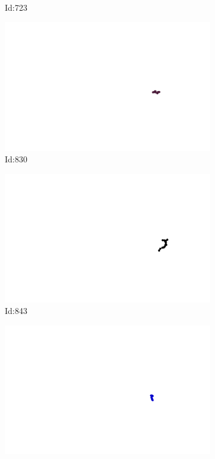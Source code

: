 \documentclass[12pt,twoside]{report}
\begin{document}
\begin{figure}
\begin{subfigure}[b]{0.20\textwidth}
\caption{Id:723}
\end{subfigure}
\begin{subfigure}[b]{0.20\textwidth}
\centering
\includegraphics[width=\textwidth]{../../trajectories/830.png}
\caption{Id:830}
\end{subfigure}
\begin{subfigure}[b]{0.20\textwidth}
\centering
\includegraphics[width=\textwidth]{../../trajectories/843.png}
\caption{Id:843}
\end{subfigure}
\begin{subfigure}[b]{0.20\textwidth}
\centering
\includegraphics[width=\textwidth]{../../trajectories/875.png}

\end{subfigure}
\end{figure}
\end{document}
